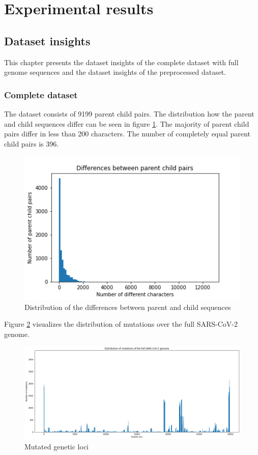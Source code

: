 \section{Experimental results} \label{experiments}

\subsection{Dataset insights}  \label{ch:experimentsA}

This chapter presents the dataset insights of the complete dataset with full genome sequences and the dataset insights of the preprocessed dataset.

\subsubsection{Complete dataset}  \label{ch:experimentsAa}

The dataset consists of 9199 parent child pairs.
The distribution how the parent and child sequences differ can be seen in figure \ref{distributionDifferencesParentChild}. The majority of parent child pairs differ in less than 200 characters. The number of completely equal parent child pairs is 396.

\begin{figure}[ht]
	\centering
	\includegraphics[width=0.7\linewidth]{figures/distributionDifferencesParentChild.png}
	\caption{Distribution of the differences between parent and child sequences \cite{own representation}}
	\label{distributionDifferencesParentChild}
\end{figure}

Figure \ref{mutatedGeneticLoci} visualizes the distribution of mutations over the full \ac{SARS-CoV-2} genome.

\begin{figure}[ht]
	\centering
	\includegraphics[width=1.0\linewidth]{figures/mutatedGeneticLoci.png}
	\caption{Mutated genetic loci \cite{own representation}}
	\label{mutatedGeneticLoci}
\end{figure}

